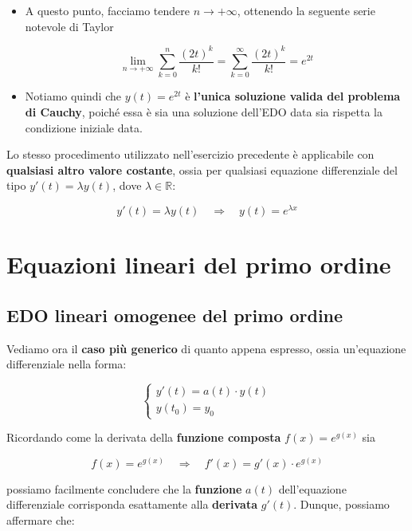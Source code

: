 \documentclass[a4paper, 12pt]{report}
\begin{document}
\begin{enumerate}
\begin{itemize}
            \item A questo punto, facciamo tendere $n \to +\infty$, ottenendo la seguente serie notevole di Taylor
            
            \[ \lim_{n \to +\infty} \sum_{k=0}^{n} \frac{(2t)^k}{k!} = \sum_{k=0}^{\infty} \frac{(2t)^k}{k!} = e^{2t}\]
            
            \item Notiamo quindi che $y(t) = e^{2t}$ è \textbf{l'unica soluzione valida del problema di Cauchy}, poiché essa è sia una soluzione dell'EDO data sia rispetta la condizione iniziale data.
        \end{itemize}
    \end{enumerate}
    
    \quad
    
    Lo stesso procedimento utilizzato nell'esercizio precedente è applicabile con \textbf{qualsiasi altro valore costante}, ossia per qualsiasi equazione differenziale del tipo $y'(t)=\lambda y(t)$, dove $\lambda \in \mathbb{R}$:
    
    \[ y'(t) = \lambda y(t) \quad \Longrightarrow \quad y(t) = e^{\lambda x}\]
    
    \newpage
    
    \section{Equazioni lineari del primo ordine}
    
    \subsection{EDO lineari omogenee del primo ordine}
    
    Vediamo ora il \textbf{caso più generico} di quanto appena espresso, ossia un'equazione differenziale nella forma:
    
    $$
    \left \{ \begin{array}{l}
        y'(t) = a(t) \cdot y(t)\\
        y(t_0) = y_0
    \end{array}\right .
    $$
    
    Ricordando come la derivata della \textbf{funzione composta }$f(x) = e^{g(x)}$ sia
    
    \[ f(x) = e^{g(x)} \quad \Longrightarrow \quad f'(x) = g'(x) \cdot e^{g(x)}\]
    
    possiamo facilmente concludere che la \textbf{funzione} $a(t)$ dell'equazione differenziale corrisponda esattamente alla \textbf{derivata} $g'(t)$. Dunque, possiamo affermare che:
    
\end{document}
